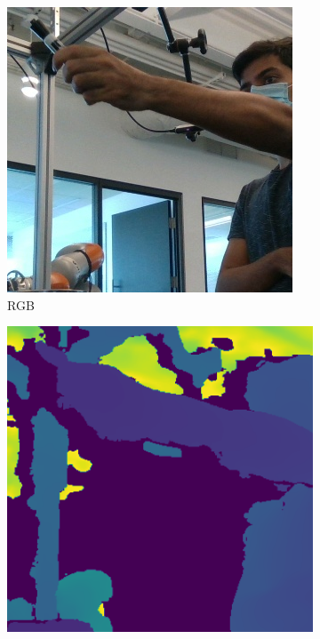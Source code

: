 \begin{figure}[h!]
    \begin{subfigure}[b]{0.16\linewidth}
    \includegraphics[width=0.98\linewidth]{figs/180000_rgb}
    \caption{RGB}
  \end{subfigure}
  \begin{subfigure}[b]{0.16\linewidth}
    \includegraphics[width=0.98\linewidth]{figs/180000_depth2}

\end{subfigure}
\end{figure}
